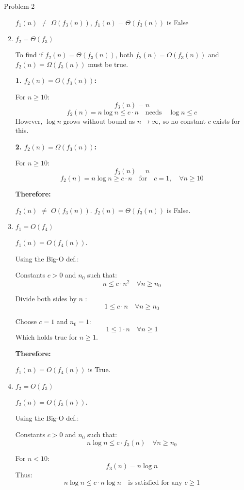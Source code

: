 \begin{problem}{}{Problem-2}
\begin{enumerate}[label=(\alph*)]
		 \(f_1(n)\) $\neq$ \(\Omega(f_3(n))\), \(f_1(n) = \Theta(f_3(n))\) is False
		
		\item \textbf{\(f_2 = \Theta(f_3)\) }
		
		To find if \(f_2(n) = \Theta(f_3(n))\), both \(f_2(n) = O(f_3(n))\) and \(f_2(n) = \Omega(f_3(n))\) must be true.
		
		\textbf{1. \(f_2(n) = O(f_3(n))\):}
		
		For \(n \geq 10\):
		\[
		f_3(n) = n
		\]
		\[
		f_2(n) = n \log n \leq c \cdot n \quad \text{needs} \quad \log n \leq c
		\]
		However, \(\log n\) grows without bound as \(n \to \infty\), so no constant \(c\) exists for this.
		
		\textbf{2. \(f_2(n) = \Omega(f_3(n))\):}
		
		For \(n \geq 10\):
		\[
		f_3(n) = n
		\]
		\[
		f_2(n) = n \log n \geq c \cdot n \quad \text{for} \quad c = 1, \quad \forall n \geq 10
		\]
		
		\textbf{Therefore:}
		
		\(f_2(n)\) $\neq$ \(O(f_3(n))\). \(f_2(n) = \Theta(f_3(n))\) is False.
		
		\item \textbf{\(f_1 = O(f_4)\) }
		
		\(f_1(n) = O(f_4(n))\).
		
		Using the Big-O def.:
		
		Constants \(c > 0\) and \(n_0\) such that:
		\[
		n \leq c \cdot n^2 \quad \forall n \geq n_0
		\]
		
		Divide both sides by \(n\) :
		\[
		1 \leq c \cdot n \quad \forall n \geq n_0
		\]
		
		Choose \(c = 1\) and \(n_0 = 1\):
		\[
		1 \leq 1 \cdot n \quad \forall n \geq 1
		\]
		Which holds true for \(n \geq 1\).
		
		\textbf{Therefore:}
		
		\(f_1(n) = O(f_4(n))\) is True.
		
		 \item \textbf{\(f_2 = O(f_3)\)}
		
		\(f_2(n) = O(f_3(n))\).
		
		Using the Big-O def.:
		
		Constants \(c > 0\) and \(n_0\) such that:
		\[
		n \log n \leq c \cdot f_3(n) \quad \forall n \geq n_0
		\]
		
		For \(n < 10\):
		\[
		f_3(n) = n \log n
		\]
		Thus:
		\[
		n \log n \leq c \cdot n \log n \quad \text{is satisfied for any } c \geq 1
		\]
		

\end{enumerate}
\end{problem}
